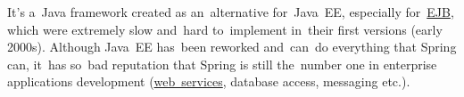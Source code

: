 \label{springframework}
It's a~Java framework created as an~alternative for~Java~EE, especially for~\hyperref[ejb]{EJB}, which were extremely slow and~hard to~implement in~their first versions (early 2000s).
Although Java~EE has~been reworked and~can~do everything that Spring can, it~has so~bad reputation that Spring is still the~number one in enterprise applications development (\hyperref[webserviceapplication]{web~services}, database access, messaging etc.).

